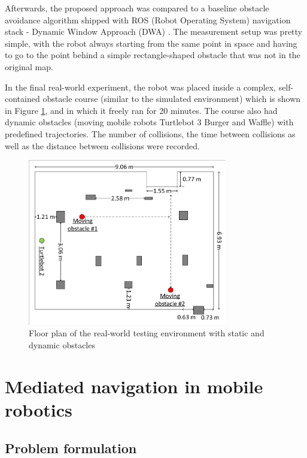Afterwards, the proposed approach was compared to a baseline obstacle avoidance algorithm shipped with ROS (Robot Operating System) \cite{Quigley2009} navigation stack - Dynamic Window Approach (DWA) \cite{Fox1997}. The measurement setup was pretty simple, with the robot always starting from the same point in space and having to go to the point behind a simple rectangle-shaped obstacle that was not in the original map.

In the final real-world experiment, the robot was placed inside a complex, self-contained obstacle course (similar to the simulated environment) which is shown in Figure \ref{fig:Fig12}, and in which it freely ran for 20 minutes. The course also had dynamic obstacles (moving mobile robots Turtlebot 3 Burger and Waffle) with predefined trajectories. The number of collisions, the time between collisions as well as the distance between collisions were recorded. 

\begin{figure}
    \centering
    \includegraphics[width=0.775\textwidth]{slike/Fig03_10.png}
    \caption{Floor plan of the real-world testing environment with static and dynamic obstacles}
    \label{fig:Fig12}
\end{figure}

\section{Mediated navigation in mobile robotics}
\label{sec:MMMediation}

\subsection{Problem formulation}
\label{sec:MMMediationFormulation}

